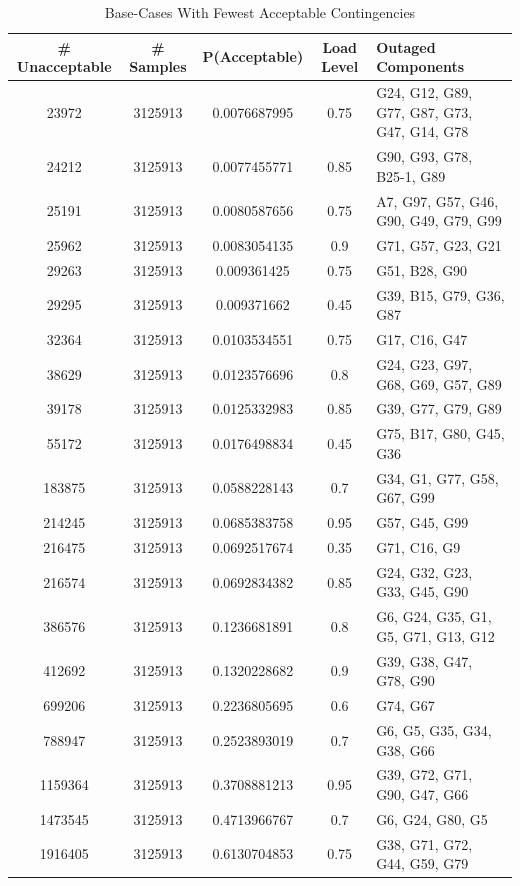 \documentclass[a4paper,oneside,12pt]{report}
\begin{document}
\begin{table}
\caption{Base-Cases With Fewest Acceptable Contingencies}
\label{table_results_worst}
\centering
\begin{tabular}{c||c||c||c||l}
\bfseries \# Unacceptable & \bfseries \# Samples & \bfseries P(Acceptable) & \bfseries Load Level & \bfseries Outaged Components \\
\hline \hline
23972 & 3125913 & 0.0076687995 & 0.75 & G24, G12, G89, G77, G87, G73, G47, G14, G78  \\  
24212 & 3125913 & 0.0077455771 & 0.85 & G90, G93, G78, B25-1, G89  \\  
25191 & 3125913 & 0.0080587656 & 0.75 & A7, G97, G57, G46, G90, G49, G79, G99  \\  
25962 & 3125913 & 0.0083054135 & 0.9 & G71, G57, G23, G21  \\  
29263 & 3125913 & 0.009361425 & 0.75 & G51, B28, G90  \\  
29295 & 3125913 & 0.009371662 & 0.45 & G39, B15, G79, G36, G87  \\  
32364 & 3125913 & 0.0103534551 & 0.75 & G17, C16, G47  \\  
38629 & 3125913 & 0.0123576696 & 0.8 & G24, G23, G97, G68, G69, G57, G89  \\  
39178 & 3125913 & 0.0125332983 & 0.85 & G39, G77, G79, G89  \\  
55172 & 3125913 & 0.0176498834 & 0.45 & G75, B17, G80, G45, G36  \\  
183875 & 3125913 & 0.0588228143 & 0.7 & G34, G1, G77, G58, G67, G99  \\  
214245 & 3125913 & 0.0685383758 & 0.95 & G57, G45, G99  \\  
216475 & 3125913 & 0.0692517674 & 0.35 & G71, C16, G9  \\  
216574 & 3125913 & 0.0692834382 & 0.85 & G24, G32, G23, G33, G45, G90  \\  
386576 & 3125913 & 0.1236681891 & 0.8 & G6, G24, G35, G1, G5, G71, G13, G12  \\  
412692 & 3125913 & 0.1320228682 & 0.9 & G39, G38, G47, G78, G90  \\  
699206 & 3125913 & 0.2236805695 & 0.6 & G74, G67  \\  
788947 & 3125913 & 0.2523893019 & 0.7 & G6, G5, G35, G34, G38, G66  \\  
1159364 & 3125913 & 0.3708881213 & 0.95 & G39, G72, G71, G90, G47, G66  \\  
1473545 & 3125913 & 0.4713966767 & 0.7 & G6, G24, G80, G5  \\  
1916405 & 3125913 & 0.6130704853 & 0.75 & G38, G71, G72, G44, G59, G79  \\  
\hline
\end{tabular}\\
\end{table}
\end{document}
